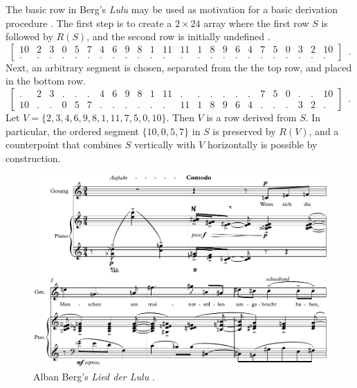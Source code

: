 \begin{example}
The basic row in Berg's \emph{Lulu} may be used as motivation for a basic derivation procedure \cite[182]{Starr1984}. The first step is to create a $2 \times 24$ array where the first row $S$ is followed by $R(S)$, and the second row is initially undefined \cite[241]{Morris1977}.
\begin{equation}
    \left[
    \begin{array}{cccccccccccc|cccccccccccc}
    10 & 2 & 3 & 0 & 5 & 7 & 4 & 6 & 9 & 8 & 1 & 11 & 11 & 1 & 8 & 9 & 6 & 4 & 7 & 5 & 0 & 3 & 2 & 10 \\
    . & . & . & . & . & . & . & . & . & . & . & . & . & . & . & . & . & . & . & . & . & . & . & .
    \end{array}
    \right] \enspace.
\end{equation}
Next, an arbitrary segment is chosen, separated from the the top row, and placed in the bottom row.
\begin{equation}
    \left[
    \begin{array}{cccccccccccc|cccccccccccc}
    . & 2 & 3 & . & . & . & 4 & 6 & 9 & 8 & 1 & 11 & . & . & . & . & . & . & 7 & 5 & 0 & . & . & 10 \\
    10 & . & . & 0 & 5 & 7 & . & . & . & . & . & . & 11 & 1 & 8 & 9 & 6 & 4 & . & . & . & 3 & 2 & .
    \end{array}
    \right] \enspace.
\end{equation}
Let $V = \{ 2, 3, 4, 6, 9, 8, 1, 11, 7, 5, 0, 10 \}$. Then $V$ is a row derived from $S$. In particular, the ordered segment $\{ 10, 0, 5, 7 \}$ in $S$ is preserved by $R(V)$, and a counterpoint that combines $S$ vertically with $V$ horizontally is possible by construction.
\label{ex:derivation}
\end{example}

\begin{figure}[htbp]
    \centering
	\includegraphics[width=6.5in]{figures/Berg_Lulu.pdf}
	\caption[Berg's \emph{Lied der Lulu}]{Alban Berg's \emph{Lied der Lulu} \cite[182]{Starr1984}.}
	\label{fig:berg-lulu}
\end{figure}


